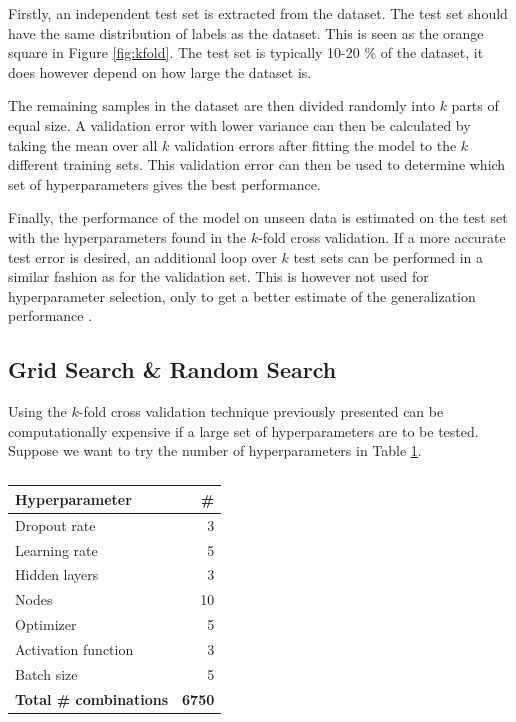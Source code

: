 Firstly, an independent test set is extracted from the dataset. The test set should have the same distribution of labels as the dataset. This is seen as the orange square in Figure \ref{fig:kfold}. The test set is typically 10-20 \% of the dataset, it does however depend on how large the dataset is.

The remaining samples in the dataset are then divided randomly into $k$ parts of equal size. A validation error with lower variance can then be calculated by taking the mean over all $k$ validation errors after fitting the model to the $k$ different training sets. This validation error can then be used to determine which set of hyperparameters gives the best performance. 

Finally, the performance of the model on unseen data is estimated on the test set with the hyperparameters found in the $k$-fold cross validation. If a more accurate test error is desired, an additional loop over $k$ test sets can be performed in a similar fashion as for the validation set. This is however not used for hyperparameter selection, only to get a better estimate of the generalization performance \citep{Goodfellow-et-al-2016}. 

\subsection{Grid Search \& Random Search}

Using the $k$-fold cross validation technique previously presented can be computationally expensive if a large set of hyperparameters are to be tested. Suppose we want to try the  number of hyperparameters in Table \ref{tab:hyper}.

\begin{table}[t]
    \centering
    \begin{tabular}{lr}
    \hline
        \textbf{Hyperparameter} & \textbf{\#} \\
        \hline \hline 
         Dropout rate & 3 \\
         Learning rate & 5 \\
         Hidden layers & 3 \\
         Nodes & 10 \\
         Optimizer & 5 \\
         Activation function & 3 \\
         Batch size & 5 \\
         \hline \hline 
         \textbf{Total \# combinations } & \textbf{6750}
    \end{tabular}
    \caption{}
    \label{tab:hyper}
\end{table}

